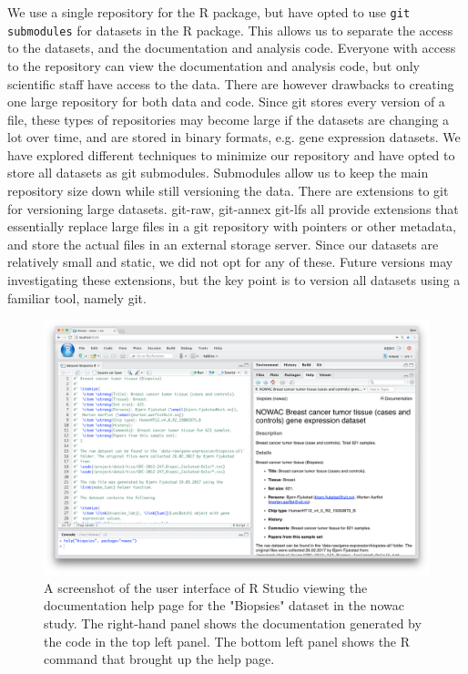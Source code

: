 We use a single repository for the R package, but have opted to use \texttt{git
submodules} for datasets in the R package.  This allows us to separate the
access to the datasets, and the documentation and analysis code. Everyone with
access to the repository can view the documentation and analysis code, but only
scientific staff have access to the data.  There are however drawbacks to
creating one large repository for both data and code. Since git stores every
version of a file, these types of repositories may become large if the datasets
are changing a lot over time, and are stored in binary formats, e.g. gene
expression datasets. We have explored different techniques to minimize our
repository and have opted to store all datasets as git
submodules\cite{submodule}. Submodules allow us to keep the main repository size
down while still versioning the data.  There are extensions to git for
versioning large datasets. git-raw\cite{gitraw}, git-annex\cite{gitannex}
git-lfs\cite{gitlfs} all provide extensions that essentially replace 
large files in a git repository with pointers or other metadata, and store the
actual files in an external storage server. Since our datasets are relatively
small and static, we did not opt for any of these. Future versions may
investigating these extensions, but the key point is to version all datasets
using a familiar tool, namely git. 

\begin{figure}
  \includegraphics[width=\linewidth]{figures/rpkg.png}
    \caption[A screenshot of the user interface of R Studio.]{A screenshot of
    the user interface of R Studio viewing the documentation help page for the
    "Biopsies" dataset in the \gls{nowac} study.  The right-hand panel shows the
    documentation generated by the code in the top left panel. The bottom left
    panel shows the R command that brought up the help page.}
    \label{rpkgfig} 
\end{figure}

